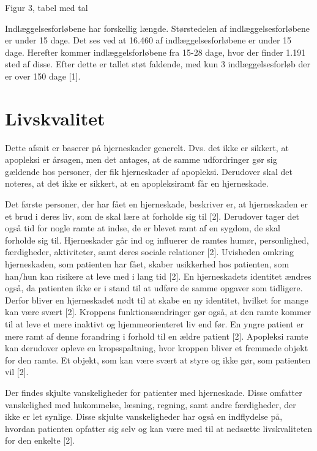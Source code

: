 Figur 3, tabel med tal

Indlæggelsesforløbene har forskellig længde. Størstedelen af indlæggelsesforløbene er under 15 dage. Det ses ved at 16.460 af indlæggelsesforløbene er under 15 dage. Herefter kommer indlæggelsforløbene fra 15-28 dage, hvor der finder 1.191 sted af disse. Efter dette er tallet støt faldende, med kun 3 indlæggelsesforløb der er over 150 dage [1]. 



\section{Livskvalitet}

Dette afsnit er baserer på hjerneskader generelt. Dvs. det ikke er sikkert, at apopleksi er årsagen, men det antages, at de samme udfordringer gør sig gældende hos personer, der fik hjerneskader af apopleksi. Derudover skal det noteres, at det ikke er sikkert, at en apopleksiramt får en hjerneskade. 

Det første personer, der har fået en hjerneskade, beskriver er, at hjerneskaden er et brud i deres liv, som de skal lære at forholde sig til [2]. Derudover tager det også tid for nogle ramte at indse, de er blevet ramt af en sygdom, de skal forholde sig til. Hjerneskader går ind og influerer de ramtes humør, personlighed, færdigheder, aktiviteter, samt deres sociale relationer [2]. Uvisheden omkring hjerneskaden, som patienten har fået, skaber usikkerhed hos patienten, som han/hun kan risikere at leve med i lang tid [2]. En hjerneskadets identitet ændres også, da patienten ikke er i stand til at udføre de samme opgaver som tidligere. Derfor bliver en hjerneskadet nødt til at skabe en ny identitet, hvilket for mange kan være svært [2]. Kroppens funktionsændringer gør også, at den ramte kommer til at leve et mere inaktivt og hjemmeorienteret liv end før. En yngre patient er mere ramt af denne forandring i forhold til en ældre patient [2]. Apopleksi ramte kan derudover opleve en kropsspaltning, hvor kroppen bliver et fremmede objekt for den ramte. Et objekt, som kan være svært at styre og ikke gør, som patienten vil [2]. 

Der findes skjulte vanskeligheder for patienter med hjerneskade. Disse omfatter vanskelighed med hukommelse, læsning, regning, samt andre færdigheder, der ikke er let synlige. Disse skjulte vanskeligheder har også en indflydelse på, hvordan patienten opfatter sig selv og kan være med til at nedsætte livskvaliteten for den enkelte [2]. 

